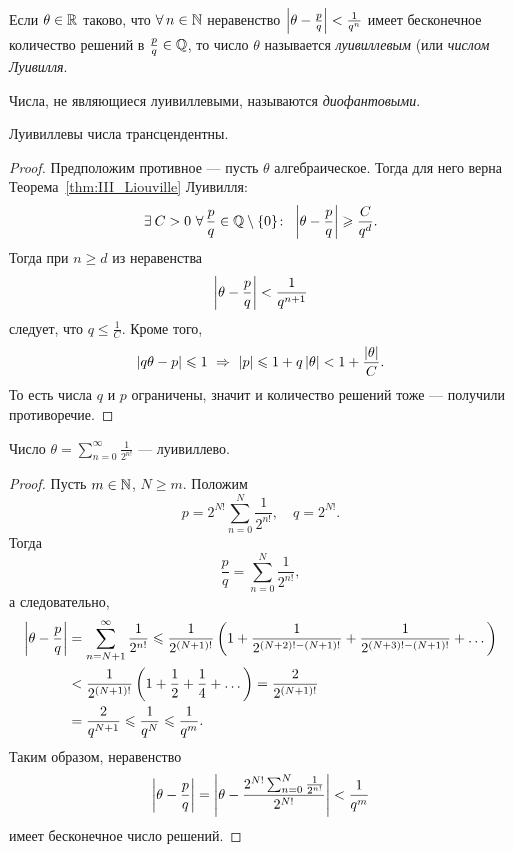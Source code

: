 \begin{ndefinition}
\label{def:III_Liouville-number}
    Если $\theta \in \mathbb{R}$ таково, что $\forall n \in \NN$ неравенство $\left| \theta - \frac{p}{q} \right| < \frac{1}{q^n}$ имеет бесконечное количество решений в $\frac{p}{q} \in \mathbb{Q}$, то число $\theta$  называется \emph{луивиллевым} (или \emph{числом Луивилля}.
\end{ndefinition}

\begin{ndefinition}
\label{def:III_Diophantine-number}
     Числа, не являющиеся луивиллевыми, называются \emph{диофантовыми}.
\end{ndefinition}

\begin{proposition}
\label{pr:III-1}
    Луивиллевы числа трансцендентны.
\end{proposition}
\begin{proof}
    Предположим противное --- пусть $\theta$ алгебраическое. Тогда для него верна Теорема~\ref{thm:III_Liouville} Луивилля:
    \[
        \exists C > 0\ \forall \frac{p}{q} \in \QQ \setminus \{ 0 \}\colon \ \abs{\theta - \frac{p}{q}} \ge \frac{C}{q^d}.
    \] 
    Тогда при $n \ge d$ из неравенства 
    \[
        \left| \theta - \frac{p}{q} \right| < \frac{1}{q^{n + 1}}
    \]
    следует, что $q \le \frac{1}{C}$. Кроме того, 
    \[
        \abs{q\theta - p} \le 1 \ \Rightarrow \ 
        \abs{p} \le 1 + q\abs{\theta} < 1 + \frac{\abs{\theta}}{C}.
    \]
    То есть числа $q$ и $p$ ограничены, значит и количество решений тоже --- получили противоречие.
\end{proof}

\begin{example}
    Число $\theta = \sum_{n=0}^{\infty} \frac{1}{2^{n!}}$ --- луивиллево.
\end{example}
\begin{proof}
    Пусть $m \in \mathbb{N}$, $N \ge m$. Положим 
    \[
        p = 2^{N!} \sum_{n=0}^{N} \frac{1}{2^{n!}}, 
        \quad 
        q = 2^{N!}.
    \]
    Тогда
    \[
        \frac{p}{q} = \sum_{n=0}^{N} \frac{1}{2^{n!}},
    \]
    а следовательно,
    \begin{align*}
        \left| \theta - \frac{p}{q} \right| &= \sum_{n=N+1}^{\infty} \frac{1}{2^{n!}} 
          \leqslant \frac{1}{2^{(N+1)!}}\left( 1 + \frac{1}{2^{(N+2)! - (N+1)!}} + \frac{1}{2^{(N+3)! - (N+1)!}} + \dots \right) \\
          &< \frac{1}{2^{(N+1)!}}\left( 1 + \frac{1}{2} + \frac{1}{4} + \dots \right) = \frac{2}{2^{(N+1)!}} \\
          &= \frac{2}{q^{N+1}} \leqslant \frac{1}{q^N} \leqslant \frac{1}{q^m}.
    \end{align*}
    Таким образом, неравенство 
    \[
        \left| \theta - \frac{p}{q} \right| 
        = \left| \theta - \frac{2^{N!} \sum_{n=0}^{N} \frac{1}{2^{n!}}}{2^{N!}} \right| 
        < \frac{1}{q^m}
    \]
    имеет бесконечное число решений.
\end{proof}

